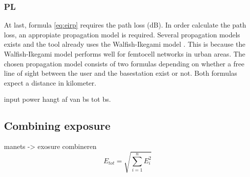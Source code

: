 \subsubsection{PL}
\label{subsec:pl}
At last, formula \ref{eq:eirp} requires the path loss (dB). In order calculate the path loss, an appropiate propagation model is required. Several propagation models exists and the tool already uses the Walfish-Ikegami model \cite{J2}.
This is because the Walfish-Ikegami model performs well for femtocell networks in urban areas. %
The chosen propagation model consists of two formulas depending on whether a free line of sight between the user and the basestation exist or not. Both formulas expect a distance in kilometer. %

input power hangt af van bs tot bs.

\subsection{Combining exposure}
\label{sec:combiningexposure}
manets -> exosure combineren
\begin{equation}
E_{tot} = \sqrt{\sum_{i=1}^{n} E_i^2}
\label{eq:totalexposure}
\end{equation}






